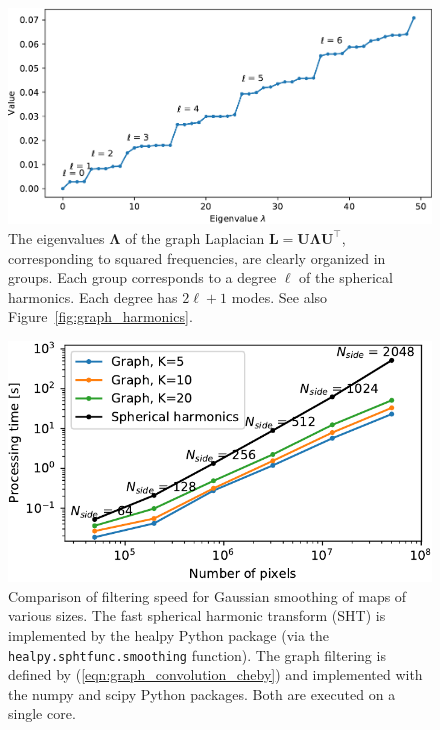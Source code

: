\documentclass[final,twocolumn,3p,times,authoryear]{elsarticle}
\newcommand{\figref}[1]{Figure~\ref{fig:#1}}
\newcommand{\eqnref}[1]{(\ref{eqn:#1})}
\renewcommand{\b}[1]{{\bm{#1}}}   %
\newcommand{\1}{\b{1}}              %
\newcommand{\0}{\b{0}}              %
\renewcommand{\L}{\b{L}}
\newcommand{\U}{\b{U}}
\newcommand{\trans}{^\intercal}
\newcommand{\bLambda}{\b{\Lambda}}
\begin{document}
\begin{figure}
	\centering
	\includegraphics[width=\linewidth]{figures/graph_eigenvalues}
	\caption{The eigenvalues $\bLambda$ of the graph Laplacian $\L = \U \bLambda \U\trans$, corresponding to squared frequencies, are clearly organized in groups. Each group corresponds to a degree $\ell$ of the spherical harmonics. Each degree has $2\ell+1$ modes. See also \figref{graph_harmonics}.}
	\label{fig:graph_eigenvalues}
\end{figure}

\begin{figure}
	\centering
	\includegraphics[width=\linewidth]{figures/filtering_speed}
	\caption{Comparison of filtering speed for Gaussian smoothing of maps of various sizes. The fast spherical harmonic transform (SHT) is implemented by the healpy Python package (via the \texttt{healpy.sphtfunc.smoothing} function). The graph filtering is defined by \eqnref{graph_convolution_cheby} and implemented with the numpy and scipy Python packages. Both are executed on a single core.}
	\label{fig:filtering_speed}
\end{figure}
\end{document}
